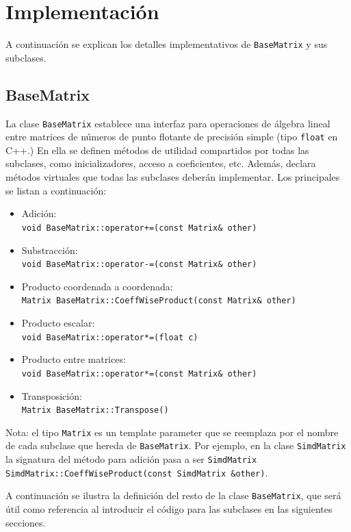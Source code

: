 \documentclass[a4paper, 10pt, twoside]{article}
\newcommand{\cc}[1]{\texttt{#1}}
\begin{document}
\section{Implementación}

A continuación se explican los detalles implementativos de \cc{BaseMatrix} y
sus subclases.


\subsection{BaseMatrix}

La clase \cc{BaseMatrix} establece una interfaz para operaciones de álgebra
lineal entre matrices de números de punto flotante de precisión simple (tipo
\cc{float} en C++.) En ella se definen métodos de utilidad compartidos por
todas las subclases, como inicializadores, acceso a coeficientes, etc. Además,
declara métodos virtuales que todas las subclases deberán implementar. Los
principales se listan a continuación:

\begin{itemize}
  \item Adición: \\
        \cc{void BaseMatrix::operator+=(const Matrix\& other)}
  \item Substracción: \\
        \cc{void BaseMatrix::operator-=(const Matrix\& other)}
  \item Producto coordenada a coordenada: \\
        \cc{Matrix BaseMatrix::CoeffWiseProduct(const Matrix\& other)}
  \item Producto escalar: \\
        \cc{void BaseMatrix::operator*=(float c)}
  \item Producto entre matrices: \\
        \cc{void BaseMatrix::operator*=(const Matrix\& other)}
  \item Transposición: \\
        \cc{Matrix BaseMatrix::Transpose()}
\end{itemize}

Nota: el tipo \cc{Matrix} es un template parameter que se reemplaza por el
nombre de cada subclase que hereda de \cc{BaseMatrix}. Por ejemplo, en la clase
\cc{SimdMatrix} la signatura del método para adición pasa a ser \cc{SimdMatrix
SimdMatrix::CoeffWiseProduct(const SimdMatrix \&other)}.

A continuación se ilustra la definición del resto de la clase \cc{BaseMatrix},
que será útil como referencia al introducir el código para las subclases en las
siguientes secciones.
\end{document}
